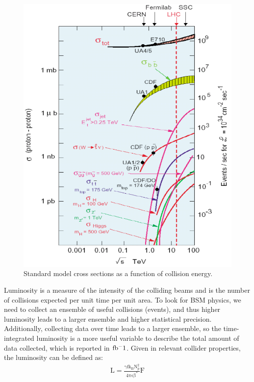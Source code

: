 \begin{figure}
\begin{center}
\includegraphics[width=1.0\linewidth]{figs/SMxsecs.png}
\caption{Standard model cross sections as a function of collision energy.}
\label{figs:SMxsecs}
\end{center}
\end{figure}


  
Luminosity is a measure of the intensity of the colliding beams and is the number of collisions expected per unit time per unit area.  
To look for BSM physics, we need to collect an ensemble of useful collisions (events), and thus higher luminosity leads to a larger ensemble and higher statistical precision.  
Additionally, collecting data over time leads to a larger ensemble, so the time-integrated luminosity is a more useful variable to describe the total amount of data collected, 
which is reported in $\mathrm{fb^-1}$.  Given in relevant collider properties, the luminosity can be defined as: 
\begin{eqnarray}
\mathrm{L = \frac{\gamma f k_{B} N_{p}^{2}}{4 \pi \epsilon \beta^{*}} F}
\end{eqnarray}  

